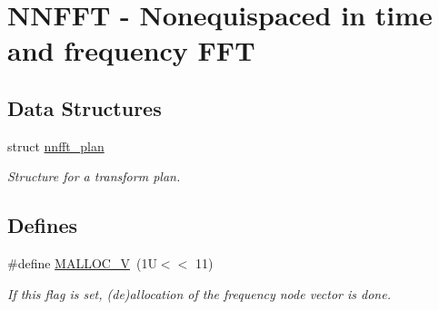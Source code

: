 \hypertarget{group__nnfft}{
\section{NNFFT - Nonequispaced in time and frequency FFT}
\label{group__nnfft}
}
\subsection*{Data Structures}
\begin{CompactItemize}
\item 
struct \hyperlink{structnnfft__plan}{nnfft\_\-plan}
\begin{CompactList}\small\item\em Structure for a transform plan. \item\end{CompactList}\end{CompactItemize}
\subsection*{Defines}
\begin{CompactItemize}
\item 
\#define \hyperlink{group__nnfft_gbfc80597fb6dcd28f3b9728bd7082642}{MALLOC\_\-V}~(1U$<$$<$ 11)
\begin{CompactList}\small\item\em If this flag is set, (de)allocation of the frequency node vector is done. \item\end{CompactList}\end{CompactItemize}
